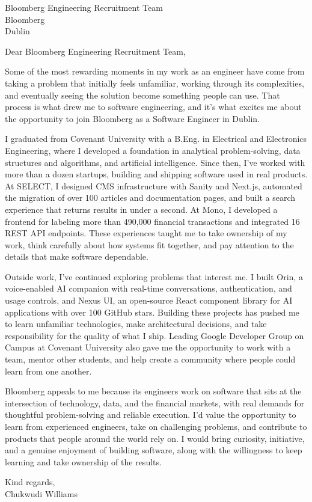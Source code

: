 \documentclass{resume}
\newcommand{\company}{Bloomberg}
\newcommand{\hiringmanager}{Bloomberg Engineering Recruitment Team}
\begin{document}
\vspace{0.8em}
\noindent
\hiringmanager \\
\company \\
Dublin

\vspace{0.7em}
\noindent Dear \hiringmanager,

Some of the most rewarding moments in my work as an engineer have come from taking a problem that initially feels unfamiliar, working through its complexities, and eventually seeing the solution become something people can use. That process is what drew me to software engineering, and it's what excites me about the opportunity to join Bloomberg as a Software Engineer in Dublin.

I graduated from Covenant University with a B.Eng. in Electrical and Electronics Engineering, where I developed a foundation in analytical problem-solving, data structures and algorithms, and artificial intelligence. Since then, I've worked with more than a dozen startups, building and shipping software used in real products. At SELECT, I designed CMS infrastructure with Sanity and Next.js, automated the migration of over 100 articles and documentation pages, and built a search experience that returns results in under a second. At Mono, I developed a frontend for labeling more than 490,000 financial transactions and integrated 16 REST API endpoints. These experiences taught me to take ownership of my work, think carefully about how systems fit together, and pay attention to the details that make software dependable.

Outside work, I've continued exploring problems that interest me. I built Orin, a voice-enabled AI companion with real-time conversations, authentication, and usage controls, and Nexus UI, an open-source React component library for AI applications with over 100 GitHub stars. Building these projects has pushed me to learn unfamiliar technologies, make architectural decisions, and take responsibility for the quality of what I ship. Leading Google Developer Group on Campus at Covenant University also gave me the opportunity to work with a team, mentor other students, and help create a community where people could learn from one another.

Bloomberg appeals to me because its engineers work on software that sits at the intersection of technology, data, and the financial markets, with real demands for thoughtful problem-solving and reliable execution. I'd value the opportunity to learn from experienced engineers, take on challenging problems, and contribute to products that people around the world rely on. I would bring curiosity, initiative, and a genuine enjoyment of building software, along with the willingness to keep learning and take ownership of the results.

\vspace{0.8em}
\noindent Kind regards, \\[0.6em]
Chukwudi Williams
\end{document}
